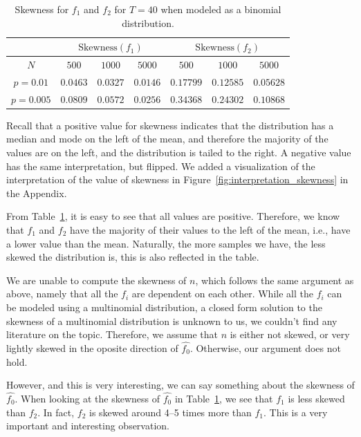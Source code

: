 \begin{table}[tbp]
    \centering
    \begin{tabular}{c|c c c| c c c}
        \toprule
         & \multicolumn{3}{c}{$\mathrm{Skewness}(f_1)$} & \multicolumn{3}{c}{$\mathrm{Skewness}(f_2)$} \\
        \midrule
        $N$ & $500$ & $1000$ & $5000$ & $500$ & $1000$ & $5000$ \\
        \midrule
        $p=0.01$  & $0.0463$   & $0.0327$  & $0.0146$ & $0.17799$ & $0.12585$ & $0.05628$ \\
        $p=0.005$ & $0.0809$   & $0.0572$  & $0.0256$ & $0.34368$ & $0.24302$ & $0.10868$ \\
    \end{tabular}
    \caption{Skewness for $f_1$ and $f_2$ for $T=40$ when modeled as a binomial distribution.}
    \label{tab:skewness_f1_f2}
\end{table}

Recall that a positive value for skewness indicates that the distribution has a median and mode on the left of the mean, and therefore the majority of the values are on the left, and the distribution is tailed to the right. A negative value has the same interpretation, but flipped. We added a visualization of the interpretation of the value of skewness in Figure~\ref{fig:interpretation_skewness} in the Appendix.

From Table~\ref{tab:skewness_f1_f2}, it is easy to see that all values are positive. Therefore, we know that $f_1$ and $f_2$ have the majority of their values to the left of the mean, i.e., have a lower value than the mean.
Naturally, the more samples we have, the less skewed the distribution is, this is also reflected in the table.

We are unable to compute the skewness of $n$, which follows the same argument as above, namely that all the $f_i$ are dependent on each other. While all the $f_i$ can be modeled using a multinomial distribution, a closed form solution to the skewness of a multinomial distribution is unknown to us, we couldn't find any literature on the topic.
Therefore, we assume that $n$ is either not skewed, or very lightly skewed in the oposite direction of $\hat{f_0}$. Otherwise, our argument does not hold.

However, and this is very interesting, we can say something about the skewness of $\hat{f_0}$.
When looking at the skewness of $\hat{f_0}$ in Table~\ref{tab:skewness_f1_f2}, we see that $f_1$ is less skewed than $f_2$. In fact, $f_2$ is skewed around 4--5 times more than $f_1$.
This is a very important and interesting observation. 

